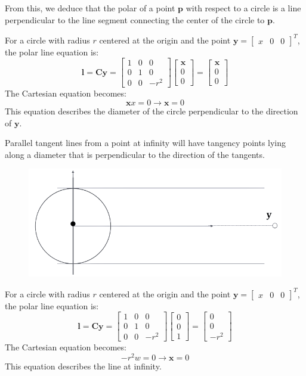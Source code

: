 From this, we deduce that the polar of a point $\mathbf{p}$ with respect to a circle is a line perpendicular to the line segment connecting the center of the circle to $\mathbf{p}$.
\begin{example}
    For a circle with radius $r$ centered at the origin and the point $\mathbf{y}={\begin{bmatrix} x & 0 & 0 \end{bmatrix}}^T$, the polar line equation is:
    \[\mathbf{l}=\mathbf{Cy} = \begin{bmatrix} 1 & 0 & 0 \\ 0 & 1 & 0 \\ 0 & 0 & -r^2 \end{bmatrix} \begin{bmatrix} \mathbf{x} \\ 0 \\ 0 \end{bmatrix} =  \begin{bmatrix} \mathbf{x} \\ 0 \\ 0 \end{bmatrix}\]
    The Cartesian equation becomes:
    \[\mathbf{x} x=0 \rightarrow \mathbf{x}=0\]
    This equation describes the diameter of the circle perpendicular to the direction of $\mathbf{y}$.
\end{example}
Parallel tangent lines from a point at infinity will have tangency points lying along a diameter that is perpendicular to the direction of the tangents.
\begin{figure}[H]
    \centering
    \includegraphics[width=0.5\linewidth]{images/parallel.png}
\end{figure}
\begin{example}
    For a circle with radius $r$ centered at the origin and the point $\mathbf{y}={\begin{bmatrix} x & 0 & 0 \end{bmatrix}}^T$, the polar line equation is:
    \[\mathbf{l}=\mathbf{Cy}=\begin{bmatrix} 1 & 0 & 0 \\ 0 & 1 & 0 \\ 0 & 0 & -r^2 \end{bmatrix}\begin{bmatrix} 0 \\ 0 \\ 1 \end{bmatrix} = \begin{bmatrix} 0 \\ 0 \\ -r^2 \end{bmatrix}\]
    The Cartesian equation becomes:
    \[-r^2w=0 \rightarrow \mathbf{x}=0\]
    This equation describes the line at infinity. 
\end{example}
